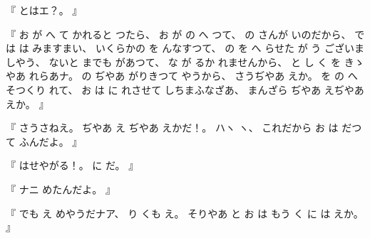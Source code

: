 %
『
とはエ？。
』

%
『
お
が
へ
て
かれると
つたら、
%
お
が
の
へ
つて、
%
の%
さんが
いのだから、
%
では
は
みますまい、
%
いくらかの
を
んなすつて、
%
の
を
へ
%
らせた
が
う
ございましやう、
%
ないと
までも
があつて、%
%
な
が
るか
れませんから、
%
と
し
く
を
きゝやあ%
れらあナ。
%
の
ぢやあ
がりきつて
やうから、
%
さうぢやあ
えか。
%
を
の%
へ
そつくり
れて、
%
お
は
に
れさせて
しちまふなざあ、
%
まんざら
ぢやあ
えぢやあ
えか。
』

%
『
さうさねえ。
%
ぢやあ
え
ぢやあ
えかだ！。
%
ハヽ
ヽ、
%
これだから
お
は
だつて
ふんだよ。
』

%
『
はせやがる！。
%
に
だ。
』

%
『
ナニ
めたんだよ。
』

%
『
でも
え
めやうだナア、
%
り
くも
え。
%
そりやあ
と
お
は
もう
く
に
は
えか。
』

